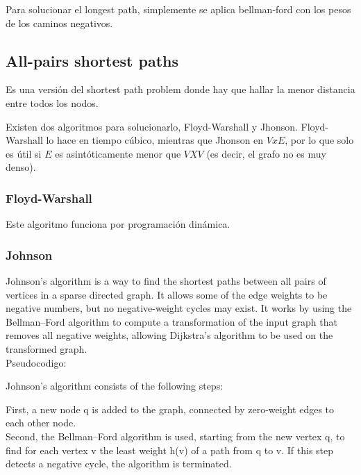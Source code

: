 \documentclass[10pt,letterpaper,twocolumn,twosided]{article}
\newcommand{\codigofuente}[1]{

\dotfill
}
\begin{document}
Para solucionar el longest path, simplemente se aplica bellman-ford con los pesos de los caminos negativos.

\codigofuente{src/graphs/bellman.cpp}

\subsection{All-pairs shortest paths}

Es una versión del shortest path problem donde hay que hallar la menor distancia entre todos los nodos.

Existen dos algoritmos para solucionarlo, Floyd-Warshall y Jhonson. Floyd-Warshall lo hace en tiempo cúbico, mientras que Jhonson en $V x E$, por lo que solo es útil si $E$ es asintóticamente menor que $V X V$ (es decir, el grafo no es muy denso).

\subsubsection{Floyd-Warshall}

Este algoritmo funciona por programación dinámica.

\codigofuente{src/graphs/floydwarshall.cpp}

\subsubsection{Johnson}

Johnson's algorithm is a way to find the shortest paths between all pairs of vertices in a
sparse directed graph. It allows some of the edge weights to be negative numbers, but no 
negative-weight cycles may exist. It works by using the Bellman–Ford algorithm to compute a
transformation of the input graph that removes all negative weights, allowing Dijkstra's algorithm 
to be used on the transformed graph.\\

Pseudocodigo:

Johnson's algorithm consists of the following steps:

First, a new node q is added to the graph, connected by zero-weight edges to each other node.\\

Second, the Bellman–Ford algorithm is used, starting from the new vertex q, to find for each vertex v the 
least weight h(v) of a path from q to v. If this step detects a negative cycle, the algorithm is terminated.\\
\end{document}
